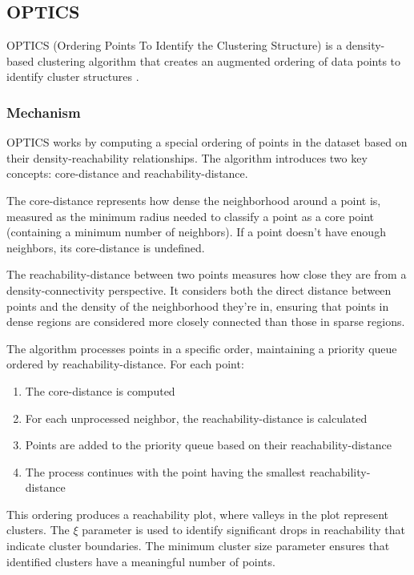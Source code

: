 \subsection{OPTICS}
\label{subsec:methods-optics}

OPTICS (Ordering Points To Identify the Clustering Structure) is a density-based clustering algorithm that creates an augmented ordering of data points to identify cluster structures \cite{1999-optics}.

\subsubsection{Mechanism}

OPTICS works by computing a special ordering of points in the dataset based on their density-reachability relationships. The algorithm introduces two key concepts: core-distance and reachability-distance.

The core-distance represents how dense the neighborhood around a point is, measured as the minimum radius needed to classify a point as a core point (containing a minimum number of neighbors). If a point doesn't have enough neighbors, its core-distance is undefined.

The reachability-distance between two points measures how close they are from a density-connectivity perspective. It considers both the direct distance between points and the density of the neighborhood they're in, ensuring that points in dense regions are considered more closely connected than those in sparse regions.

The algorithm processes points in a specific order, maintaining a priority queue ordered by reachability-distance. For each point:
\begin{enumerate}
    \item The core-distance is computed
    \item For each unprocessed neighbor, the reachability-distance is calculated
    \item Points are added to the priority queue based on their reachability-distance
    \item The process continues with the point having the smallest reachability-distance
\end{enumerate}

This ordering produces a reachability plot, where valleys in the plot represent clusters. The \(\xi\) parameter is used to identify significant drops in reachability that indicate cluster boundaries. The minimum cluster size parameter ensures that identified clusters have a meaningful number of points.

